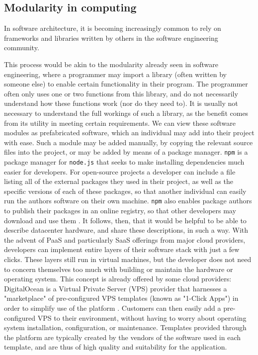 \documentclass[11pt]{article}
\begin{document}
	\subsection{Modularity in computing}
		In software architecture, it is becoming increasingly common to rely on frameworks and libraries written by others in the software engineering community. 

		This process would be akin to the modularity already seen in software engineering, where a programmer may import a library (often written by someone else) to enable certain functionality in their program. 
		The programmer often only uses one or two functions from this library, and do not necessarily understand how these functions work (nor do they need to).
		It is usually not necessary to understand the full workings of such a library, as the benefit comes from its utility in meeting certain requirements. 
		We can view these software modules as prefabricated software, which an individual may add into their project with ease. 
		Such a module may be added manually, by copying the relevant source files into the project, or may be added by means of a package manager.
		\verb|npm| is a package manager for \verb|node.js| that seeks to make installing dependencies much easier for developers.
		For open-source projects a developer can include a file listing all of the external packages they used in their project, as well as the specific versions of each of these packages, so that another individual can easily run the authors software on their own machine.
		\verb|npm| also enables package authors to publish their packages in an online registry, so that other developers may download and use them \cite{Wittern2016}.
		It follows, then, that it would be helpful to be able to describe datacenter hardware, and share these descriptions, in such a way. 
		With the advent of PaaS and particularly SaaS offerings from major cloud providers, developers can implement entire layers of their software stack with just a few clicks. 
		These layers still run in virtual machines, but the developer does not need to concern themselves too much with building or maintain the hardware or operating system.
		This concept is already offered by some cloud providers: DigitalOcean is a Virtual Private Server (VPS) provider that harnesses a "marketplace" of pre-configured VPS templates (known as "1-Click Apps") in order to simplify use of the platform \cite{DigitalOcean2020}. 
		Customers can then easily add a pre-configured VPS to their environment, without having to worry about operating system installation, configuration, or maintenance. 
		Templates provided through the platform are typically created by the vendors of the software used in each template, and are thus of high quality and suitability for the application.
\end{document}
